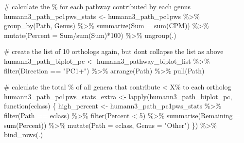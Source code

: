 \documentclass[
  letterpaper,
]{book}
\newenvironment{Shaded}{}{}
\newcommand{\AttributeTok}[1]{\textcolor[rgb]{0.84,0.23,0.29}{#1}}
\newcommand{\CommentTok}[1]{\textcolor[rgb]{0.42,0.45,0.49}{#1}}
\newcommand{\ControlFlowTok}[1]{\textcolor[rgb]{0.84,0.23,0.29}{#1}}
\newcommand{\DecValTok}[1]{\textcolor[rgb]{0.00,0.36,0.77}{#1}}
\newcommand{\FunctionTok}[1]{\textcolor[rgb]{0.44,0.26,0.76}{#1}}
\newcommand{\NormalTok}[1]{\textcolor[rgb]{0.14,0.16,0.18}{#1}}
\newcommand{\OtherTok}[1]{\textcolor[rgb]{0.44,0.26,0.76}{#1}}
\newcommand{\SpecialCharTok}[1]{\textcolor[rgb]{0.00,0.36,0.77}{#1}}
\newcommand{\StringTok}[1]{\textcolor[rgb]{0.01,0.18,0.38}{#1}}
\begin{document}
\begin{Shaded}
\begin{Highlighting}[]
\CommentTok{\# calculate the \% for each pathway contributed by each genus}
\NormalTok{humann3\_path\_pc1pws\_stats }\OtherTok{\textless{}{-}}\NormalTok{ humann3\_path\_pc1pws }\SpecialCharTok{\%\textgreater{}\%}
  \FunctionTok{group\_by}\NormalTok{(Path, Genus) }\SpecialCharTok{\%\textgreater{}\%}
  \FunctionTok{summarize}\NormalTok{(}\AttributeTok{Sum =} \FunctionTok{sum}\NormalTok{(CPM)) }\SpecialCharTok{\%\textgreater{}\%}
  \FunctionTok{mutate}\NormalTok{(}\AttributeTok{Percent =}\NormalTok{ Sum}\SpecialCharTok{/}\FunctionTok{sum}\NormalTok{(Sum)}\SpecialCharTok{*}\DecValTok{100}\NormalTok{) }\SpecialCharTok{\%\textgreater{}\%}
  \FunctionTok{ungroup}\NormalTok{(.)}

\CommentTok{\# create the list of 10 orthologs again, but don\textquotesingle{}t collapse the list as above}
\NormalTok{humann3\_path\_biplot\_pc }\OtherTok{\textless{}{-}}\NormalTok{ humann3\_pathway\_biplot\_list }\SpecialCharTok{\%\textgreater{}\%}
  \FunctionTok{filter}\NormalTok{(Direction }\SpecialCharTok{==} \StringTok{"PC1+"}\NormalTok{) }\SpecialCharTok{\%\textgreater{}\%}
  \FunctionTok{arrange}\NormalTok{(Path) }\SpecialCharTok{\%\textgreater{}\%}
  \FunctionTok{pull}\NormalTok{(Path)}

\CommentTok{\# calculate the total \% of all genera that contribute \textless{} X\% to each ortholog}
\NormalTok{humann3\_path\_pc1pws\_stats\_extra }\OtherTok{\textless{}{-}} \FunctionTok{lapply}\NormalTok{(humann3\_path\_biplot\_pc, }\ControlFlowTok{function}\NormalTok{(eclass) \{}
\NormalTok{ high\_percent }\OtherTok{\textless{}{-}}\NormalTok{ humann3\_path\_pc1pws\_stats }\SpecialCharTok{\%\textgreater{}\%}
   \FunctionTok{filter}\NormalTok{(Path }\SpecialCharTok{==}\NormalTok{ eclass) }\SpecialCharTok{\%\textgreater{}\%}
   \FunctionTok{filter}\NormalTok{(Percent }\SpecialCharTok{\textless{}} \DecValTok{5}\NormalTok{) }\SpecialCharTok{\%\textgreater{}\%}
   \FunctionTok{summarise}\NormalTok{(}\AttributeTok{Remaining =} \FunctionTok{sum}\NormalTok{(Percent)) }\SpecialCharTok{\%\textgreater{}\%}
   \FunctionTok{mutate}\NormalTok{(}\AttributeTok{Path =}\NormalTok{ eclass,}
          \AttributeTok{Genus =} \StringTok{"Other"}\NormalTok{)}
\NormalTok{\}) }\SpecialCharTok{\%\textgreater{}\%}
 \FunctionTok{bind\_rows}\NormalTok{(.)}


\end{Highlighting}
\end{Shaded}
\end{document}
